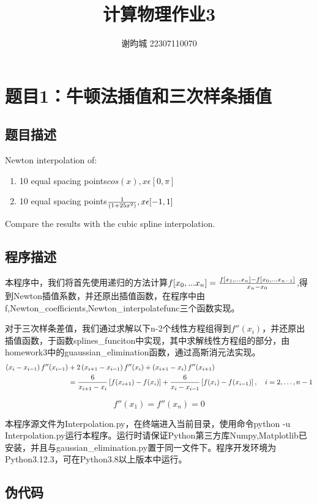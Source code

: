 \documentclass[11pt]{article}
\author{谢昀城 22307110070}
\title{计算物理作业3}
\begin{document}
\maketitle


\section{题目1：牛顿法插值和三次样条插值}
\subsection{题目描述}
Newton interpolation of:
\begin{enumerate}
    \item 10 equal spacing points$cos(x),x\epsilon[0,\pi]$
    \item 10 equal spacing points${1\over (1+25 x^2)},x\epsilon [-1,1]$
\end{enumerate}
Compare the results with the cubic spline interpolation.
\subsection{程序描述}
  本程序中，我们将首先使用递归的方法计算$f[x_0,...x_n]={f[x_1,...x_n]-f[x_0,...x_{n-1}]\over x_n-x_0}$,得到Newton插值系数，并还原出插值函数，在程序中由f,Newton\_coefficients,Newton\_interpolatefunc三个函数实现。
  
  对于三次样条差值，我们通过求解以下n-2个线性方程组得到$f''(x_i)$，并还原出插值函数，于函数splines\_funciton中实现，其中求解线性方程组的部分，由homework3中的guaussian\_elimination函数，通过高斯消元法实现。
  \begin{align*}
    \left(x_i - x_{i-1}\right) f''(x_{i-1}) 
    &+ 2\left(x_{i+1} - x_{i-1}\right) f''(x_i) 
    + \left(x_{i+1} - x_i\right) f''(x_{i+1}) \notag \\
    &= \frac{6}{x_{i+1} - x_i} \left[ f(x_{i+1}) - f(x_i) \right] 
    + \frac{6}{x_i - x_{i-1}} \left[ f(x_i) - f(x_{i-1}) \right], \quad i = 2, \dots, n-1
\end{align*}

  $$
  f''(x_1) = f''(x_n) = 0
  $$

  本程序源文件为Interpolation.py，在终端进入当前目录，使用命令python -u Interpolation.py运行本程序。运行时请保证Python第三方库Numpy,Matplotlib已安装，并且与gaussian\_elimination.py置于同一文件下。程序开发环境为Python3.12.3，可在Python3.8以上版本中运行。


\subsection{伪代码} 
\end{document}
